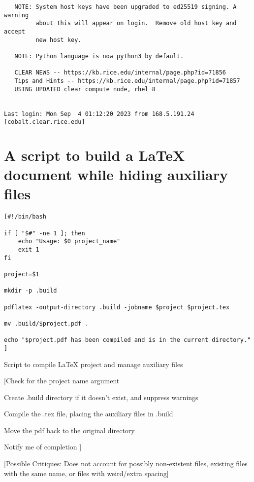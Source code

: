 \documentclass{article}
\begin{document}
\begin{verbatim}
   NOTE: System host keys have been upgraded to ed25519 signing. A warning
         about this will appear on login.  Remove old host key and accept
         new host key.
 
   NOTE: Python language is now python3 by default.
 
   CLEAR NEWS -- https://kb.rice.edu/internal/page.php?id=71856
   Tips and Hints -- https://kb.rice.edu/internal/page.php?id=71857
   USING UPDATED clear compute node, rhel 8
 

Last login: Mon Sep  4 01:12:20 2023 from 168.5.191.24
[cobalt.clear.rice.edu]
\end{verbatim}

\section{A script to build a LaTeX document while hiding auxiliary files}
\lstset{basicstyle=\ttfamily,language=bash}
\begin{lstlisting}
[#!/bin/bash

if [ "$#" -ne 1 ]; then
    echo "Usage: $0 project_name"
    exit 1
fi

project=$1

mkdir -p .build

pdflatex -output-directory .build -jobname $project $project.tex

mv .build/$project.pdf .

echo "$project.pdf has been compiled and is in the current directory."
]
\end{lstlisting}
\caption{Script to compile LaTeX project and manage auxiliary files}

[Check for the project name argument

Create .build directory if it doesn't exist, and suppress warnings

Compile the .tex file, placing the auxiliary files in .build

Move the pdf back to the original directory

Notify me of completion ]

[Possible Critiques: Does not account for possibly non-existent files, existing files with the same name, or files with weird/extra spacing]
\end{document}
